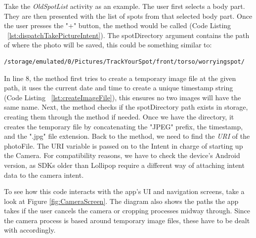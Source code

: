 Take the \emph{OldSpotList} activity as an example. The user first selects a body part. They are then presented with the list of spots from that selected body part. Once the user presses the "+" button, the  method would be called (Code Listing ~\ref{lst:dispatchTakePictureIntent}). The spotDirectory argument contains the path of where the photo will be saved, this could be something similar to:
\begin{verbatim}
/storage/emulated/0/Pictures/TrackYourSpot/front/torso/worryingspot/
\end{verbatim}
In line 8, the  method first tries to create a temporary image file at the given path, it uses the current date and time to create a unique timestamp string (Code Listing ~\ref{lst:createImageFile}), this ensures no two images will have the same name. Next, the method checks if the spotDirectory path exists in storage, creating them through the  method if needed. Once we have the directory, it creates the temporary file by concatenating the "JPEG\textunderscore" prefix, the timestamp, and the ".jpg" file extension. Back to the  method, we need to find the \emph{URI} of the photoFile. The URI variable is passed on to the Intent in charge of starting up the Camera. For compatibility reasons, we have to check the device's Android version, as SDKs older than Lollipop require a different way of attaching intent data to the camera intent.

To see how this code interacts with the app's UI and navigation screens, take a look at Figure \ref{fig:CameraScreen}. The diagram also shows the paths the app takes if the user cancels the camera or cropping processes midway through. Since the camera process is based around temporary image files, these have to be dealt with accordingly.

\clearpage

